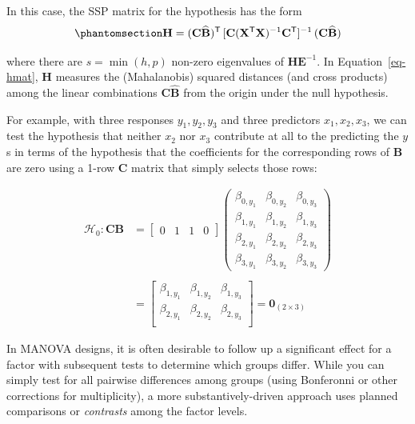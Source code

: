 \documentclass[
  letterpaper,
  10pt,
  krantz2]{krantz}
\begin{document}
In this case, the SSP matrix for the hypothesis has the form
\begin{equation}\phantomsection\label{eq-hmat}{
\mathbf{H}  =
 (\mathbf{C} \widehat{\mathbf{B}})^\mathsf{T}\,
 [\mathbf{C} (\mathbf{X}^\mathsf{T}\mathbf{X} )^{-1} \mathbf{C}^\mathsf{T}]^{-1} \,
 (\mathbf{C} \widehat{\mathbf{B}})
}\end{equation}

where there are \(s = \min(h, p)\) non-zero eigenvalues of
\(\mathbf{H}\mathbf{E}^{-1}\). In Equation~\ref{eq-hmat}, \(\mathbf{H}\)
measures the (Mahalanobis) squared distances (and cross products) among
the linear combinations \(\mathbf{C} \widehat{\mathbf{B}}\) from the
origin under the null hypothesis.

For example, with three responses \(y_1, y_2, y_3\) and three predictors
\(x_1, x_2, x_3\), we can test the hypothesis that neither \(x_2\) nor
\(x_3\) contribute at all to the predicting the \(y\)s in terms of the
hypothesis that the coefficients for the corresponding rows of
\(\mathbf{B}\) are zero using a 1-row \(\mathbf{C}\) matrix that simply
selects those rows:

\begin{eqnarray*}
\mathcal{H}_0 : \mathbf{C} \mathbf{B} & = 
\begin{bmatrix}
0 & 1 & 1 & 0
\end{bmatrix}
\begin{pmatrix}
    \beta_{0,y_1} & \beta_{0,y_2} & \beta_{0,y_3} \\ 
    \beta_{1,y_1} & \beta_{1,y_2} & \beta_{1,y_3} \\ 
    \beta_{2,y_1} & \beta_{2,y_2} & \beta_{2,y_3} \\ 
    \beta_{3,y_1} & \beta_{3,y_2} & \beta_{3,y_3} 
\end{pmatrix} \\ \\
& = 
\begin{bmatrix}
    \beta_{1,y_1} & \beta_{1,y_2} & \beta_{1,y_3} \\ 
    \beta_{2,y_1} & \beta_{2,y_2} & \beta_{2,y_3} \\ 
\end{bmatrix}
= 
\mathbf{0}_{(2 \times 3)}
\end{eqnarray*}

In MANOVA designs, it is often desirable to follow up a significant
effect for a factor with subsequent tests to determine which groups
differ. While you can simply test for all pairwise differences among
groups (using Bonferonni or other corrections for multiplicity), a more
substantively-driven approach uses planned comparisons or
\emph{contrasts} among the factor levels.
\end{document}
